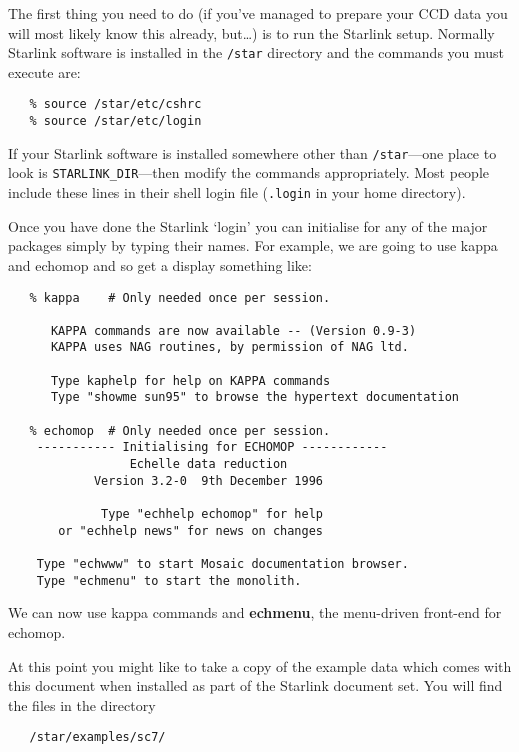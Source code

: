 \documentclass[twoside,11pt]{article}
\newcommand{\xref}[3]{#1}
\newcommand{\scspec}[2]{#1}
\newcommand{\scspec}[2]{#2}
\begin{document}
The first thing you need to do (if you've managed to prepare your CCD
data you will most likely know this already, but\ldots ) is to run the
Starlink setup.
Normally Starlink software is installed in the \verb+/star+ directory
and the commands you must execute are:

{
\scspec{\small}{ }
\begin{verbatim}
   % source /star/etc/cshrc
   % source /star/etc/login
\end{verbatim}
}

If your Starlink software is installed somewhere other than
\verb+/star+---one place to look is \verb+STARLINK_DIR+---then
modify the commands appropriately.  Most people include these lines in
their shell login file (\verb+.login+ in your home directory).

Once you have done the Starlink `login' you can initialise for any of the
major packages simply by typing their names.
For example, we are going to use
\xref{{\sc kappa}}{sun95}{}\cite{kappa} and
\xref{{\sc echomop}}{sun152}{}\cite{echomop} and so get a display
something like:

{
\scspec{\small}{ }
\begin{verbatim}
   % kappa    # Only needed once per session.

      KAPPA commands are now available -- (Version 0.9-3)
      KAPPA uses NAG routines, by permission of NAG ltd.

      Type kaphelp for help on KAPPA commands
      Type "showme sun95" to browse the hypertext documentation

   % echomop  # Only needed once per session.
    ----------- Initialising for ECHOMOP ------------
                 Echelle data reduction
            Version 3.2-0  9th December 1996

             Type "echhelp echomop" for help
       or "echhelp news" for news on changes

    Type "echwww" to start Mosaic documentation browser.
    Type "echmenu" to start the monolith.
\end{verbatim}
}

We can now use {\sc kappa} commands and
\xref{{\bf echmenu}}{sun152}{ECHMENU},
the menu-driven front-end for {\sc echomop}.

At this point you might like to take a copy of the example data which comes
with this document when installed as part of the Starlink document set.
You will find the files in the directory

{
\scspec{\small}{ }
\begin{verbatim}
   /star/examples/sc7/
\end{verbatim}
}
\end{document}
